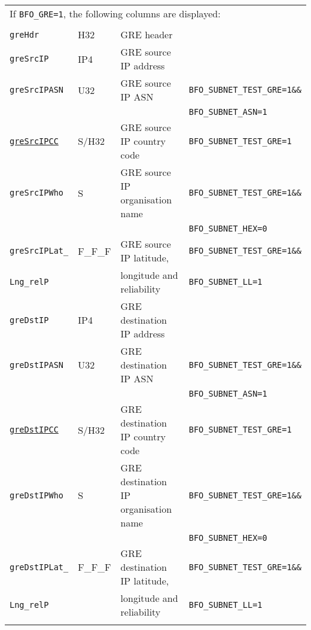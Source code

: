 \documentclass[documentation]{subfiles}
\begin{document}
\begin{longtable}{llll}
    \multicolumn{4}{l}{If {\tt BFO\_GRE=1}, the following columns are displayed:}\\\\

    {\tt greHdr}                        & H32     & GRE header                           & \\
    {\tt greSrcIP}                      & IP4     & GRE source IP address                & \\
    {\tt greSrcIPASN}                   & U32     & GRE source IP ASN                    & {\tt\small BFO\_SUBNET\_TEST\_GRE=1\&\&}\\
                                        &         &                                      & {\tt\small BFO\_SUBNET\_ASN=1}\\
    {\tt \hyperref[subnet]{greSrcIPCC}} & S/H32   & GRE source IP country code           & {\tt\small BFO\_SUBNET\_TEST\_GRE=1}\\
    {\tt greSrcIPWho}                   & S       & GRE source IP organisation name      & {\tt\small BFO\_SUBNET\_TEST\_GRE=1\&\&}\\
                                        &         &                                      & {\tt\small BFO\_SUBNET\_HEX=0}\\
    {\tt greSrcIPLat\_}                 & F\_F\_F & GRE source IP latitude,              & {\tt\small BFO\_SUBNET\_TEST\_GRE=1\&\&}\\
    {\tt \qquad Lng\_relP}              &         & \qquad longitude and reliability     & {\tt\small BFO\_SUBNET\_LL=1}\\
    {\tt greDstIP}                      & IP4     & GRE destination IP address           & \\
    {\tt greDstIPASN}                   & U32     & GRE destination IP ASN               & {\tt\small BFO\_SUBNET\_TEST\_GRE=1\&\&}\\
                                        &         &                                      & {\tt\small BFO\_SUBNET\_ASN=1}\\
    {\tt \hyperref[subnet]{greDstIPCC}} & S/H32   & GRE destination IP country code      & {\tt\small BFO\_SUBNET\_TEST\_GRE=1}\\
    {\tt greDstIPWho}                   & S       & GRE destination IP organisation name & {\tt\small BFO\_SUBNET\_TEST\_GRE=1\&\&}\\
                                        &         &                                      & {\tt\small BFO\_SUBNET\_HEX=0}\\
    {\tt greDstIPLat\_}                 & F\_F\_F & GRE destination IP latitude,         & {\tt\small BFO\_SUBNET\_TEST\_GRE=1\&\&}\\
    {\tt \qquad Lng\_relP}              &         & \qquad longitude and reliability     & {\tt\small BFO\_SUBNET\_LL=1}\\\\


\end{longtable}
\end{document}
